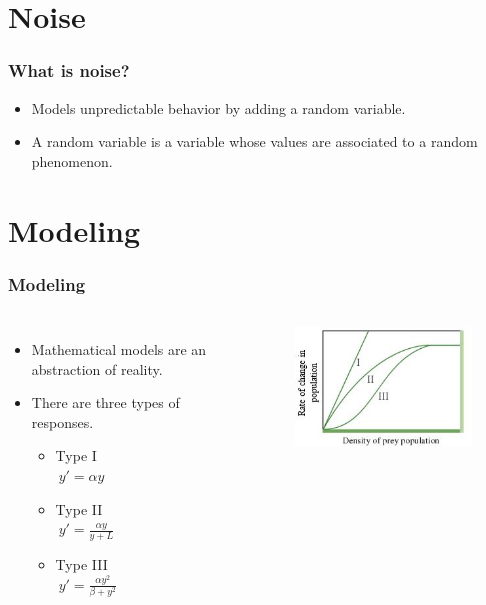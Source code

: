 \section{Noise}

\begin{frame}
  \frametitle{What is noise?}
  \begin{itemize}
  \item Models unpredictable behavior by adding a random variable.
  \item A random variable is a variable whose values are associated to a random phenomenon.
  \end{itemize}
\end{frame}

\section{Modeling}

\begin{frame}
  \frametitle{Modeling}
  \begin{columns}
      \begin{itemize}
	\item Mathematical models are an abstraction of reality.
	\item There are three types of responses. 
	\begin{itemize}
		\item Type I\\
		$\ y'=\alpha y$
		\item Type II\\
		$\ y' = \frac{\alpha y}{y+ L}$ 
		\item Type III\\
		$\ y'= \frac {\alpha y^2}{\beta + y^2}$
	\end{itemize}
       \end{itemize}
      \begin {figure}
        \centerline{\includegraphics[scale = 0.7]{Responses}}
       \end{figure}
  \end{columns}
\end{frame}

